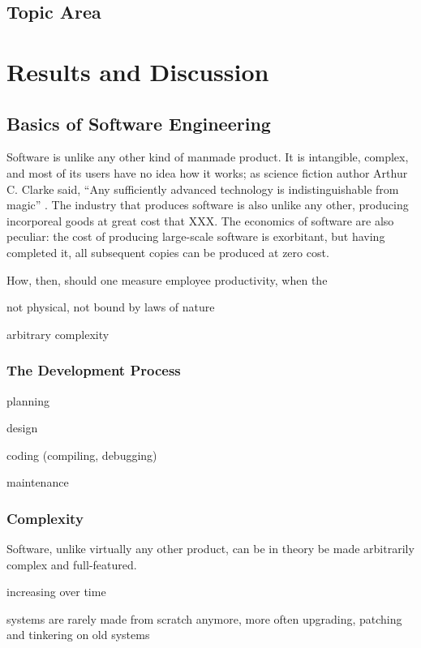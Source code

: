 \documentclass[letterpaper, 10pt]{report}
\begin{document}

\section{Topic Area}



\chapter{Results and Discussion}

\section{Basics of Software Engineering}
Software is unlike any other kind of manmade product. 
It is intangible, complex, and most of its users have no idea how it works; as science fiction author Arthur C. Clarke said, ``Any sufficiently advanced technology is indistinguishable from magic'' \parencite{about:clarke}.
The industry that produces software is also unlike any other, producing incorporeal goods at great cost that XXX.
The economics of software are also peculiar: the cost of producing large-scale software is exorbitant, but having completed it, all subsequent copies can be produced at zero cost. 

How, then, should one measure employee productivity, when the 

not physical, not bound by laws of nature

arbitrary complexity

\subsection{The Development Process}
planning

design

coding (compiling, debugging)

maintenance

\subsection{Complexity}
Software, unlike virtually any other product, can be in theory be made arbitrarily complex and full-featured.

increasing over time

systems are rarely made from scratch anymore, more often upgrading, patching and tinkering on old systems
\end{document}
